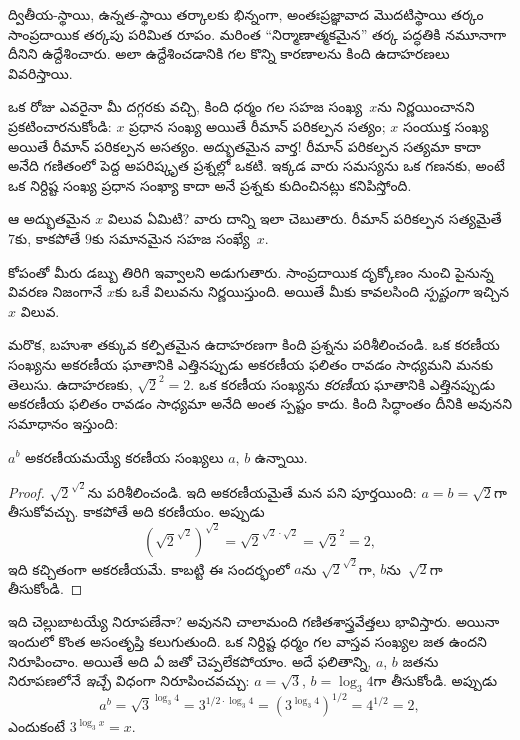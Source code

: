\documentclass[../../../include/open-logic-section]{subfiles}
\begin{document}


ద్వితీయ-స్థాయి, ఉన్నత-స్థాయి తర్కాలకు భిన్నంగా, అంతఃప్రజ్ఞావాద
మొదటిస్థాయి తర్కం సాంప్రదాయిక తర్కపు పరిమిత రూపం. మరింత
``నిర్మాణాత్మకమైన'' తర్క పద్ధతికి నమూనాగా దీనిని
ఉద్దేశించారు. అలా ఉద్దేశించడానికి గల కొన్ని కారణాలను కింది ఉదాహరణలు
వివరిస్తాయి.

ఒక రోజు ఎవరైనా మీ దగ్గరకు వచ్చి, కింది ధర్మం గల సహజ సంఖ్య~$x$ను
నిర్ణయించానని ప్రకటించారనుకోండి: $x$ ప్రధాన సంఖ్య అయితే రీమాన్
పరికల్పన సత్యం; $x$ సంయుక్త సంఖ్య అయితే రీమాన్ పరికల్పన అసత్యం.
అద్భుతమైన వార్త!{} రీమాన్ పరికల్పన సత్యమా కాదా అనేది గణితంలో పెద్ద
అపరిష్కృత ప్రశ్నల్లో ఒకటి. ఇక్కడ వారు సమస్యను ఒక గణనకు, అంటే ఒక
నిర్దిష్ట సంఖ్య ప్రధాన సంఖ్యా కాదా అనే ప్రశ్నకు కుదించినట్లు
కనిపిస్తోంది.

ఆ అద్భుతమైన $x$ విలువ ఏమిటి? వారు దాన్ని ఇలా చెబుతారు. రీమాన్
పరికల్పన సత్యమైతే $7$కు, కాకపోతే $9$కు సమానమైన సహజ సంఖ్యే~$x$.

కోపంతో మీరు డబ్బు తిరిగి ఇవ్వాలని అడుగుతారు. సాంప్రదాయిక
దృక్కోణం నుంచి పైనున్న వివరణ నిజంగానే $x$కు ఒకే విలువను
నిర్ణయిస్తుంది. అయితే మీకు కావలసింది \emph{స్పష్టంగా} ఇచ్చిన
$x$ విలువ.

మరొక, బహుశా తక్కువ కల్పితమైన ఉదాహరణగా కింది ప్రశ్నను పరిశీలించండి.
ఒక కరణీయ సంఖ్యను అకరణీయ ఘాతానికి ఎత్తినప్పుడు అకరణీయ ఫలితం రావడం
సాధ్యమని మనకు తెలుసు. ఉదాహరణకు, $\sqrt{2}^2 = 2$. ఒక కరణీయ సంఖ్యను
\emph{కరణీయ} ఘాతానికి ఎత్తినప్పుడు అకరణీయ ఫలితం రావడం సాధ్యమా
అనేది అంత స్పష్టం కాదు. కింది సిద్ధాంతం దీనికి అవునని సమాధానం
ఇస్తుంది:

\begin{thm}
$a^b$ అకరణీయమయ్యే కరణీయ సంఖ్యలు $a$, $b$ ఉన్నాయి.
\end{thm}

\begin{proof}
$\sqrt{2}^{\sqrt{2}}$ను పరిశీలించండి. ఇది అకరణీయమైతే మన పని
పూర్తయింది: $a = b = \sqrt{2}$గా తీసుకోవచ్చు. కాకపోతే అది
కరణీయం. అప్పుడు
\[
(\sqrt{2}^{\sqrt{2}})^{\sqrt{2}} = \sqrt{2}^{\sqrt{2} \cdot
  \sqrt{2}} = \sqrt{2}^2 = 2,
\]
ఇది కచ్చితంగా అకరణీయమే. కాబట్టి ఈ సందర్భంలో $a$ను
$\sqrt{2}^{\sqrt{2}}$గా, $b$ను~$\sqrt 2$గా తీసుకోండి.
\end{proof}

ఇది చెల్లుబాటయ్యే నిరూపణేనా? అవునని చాలామంది గణితశాస్త్రవేత్తలు
భావిస్తారు. అయినా ఇందులో కొంత అసంతృప్తి కలుగుతుంది.
ఒక నిర్దిష్ట ధర్మం గల వాస్తవ సంఖ్యల జత ఉందని నిరూపించాం. అయితే అది
\emph{ఏ} జతో చెప్పలేకపోయాం. అదే ఫలితాన్ని, $a$, $b$ జతను నిరూపణలోనే
\emph{ఇచ్చే} విధంగా నిరూపించవచ్చు: $a = \sqrt{3}$,
$b = \log_3 4$గా తీసుకోండి. అప్పుడు
\[
a^b = \sqrt{3}^{\log_3 4} = 3^{1/2 \cdot \log_3 4} = (3^{\log_3
  4})^{1/2} = 4^{1/2}= 2,
\]
ఎందుకంటే $3^{\log_3 x} = x$.
\end{document}
